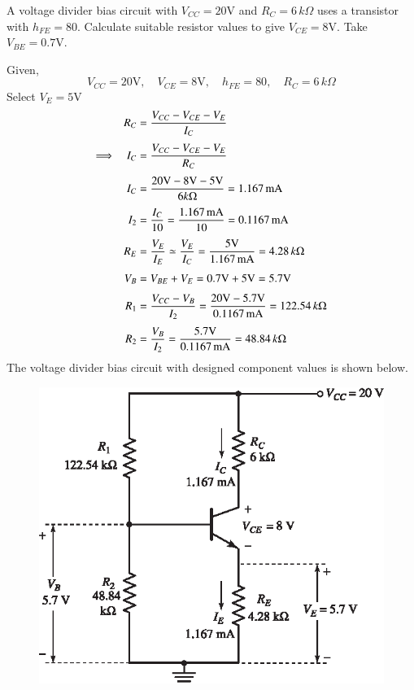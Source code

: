 \eject

\begin{example}\label{exam4.21}
A voltage divider bias circuit with $V_{CC}=20\text{V}$ and $R_{C}=6\,k\Omega$ uses a transistor with $h_{FE}=80$. Calculate suitable resistor values to give $V_{CE}=8\text{V}$. Take $V_{BE}=0.7\text{V}$.
\end{example}

\begin{solution}
Given,
$$
V_{CC}=20\text{V},\quad V_{CE}=8\text{V},\quad h_{FE}=80,\quad R_{C}=6\,k\Omega
$$
Select $V_{E}=5\text{V}$
\begin{align*}
R_{C} &= \frac{V_{CC}-V_{CE}-V_{E}}{I_{C}}\\[3pt]
\Longrightarrow\quad I_{C} &= \frac{V_{CC}-V_{CE}-V_{E}}{R_{C}}\\[3pt]
I_{C} &= \frac{20\text{V}-8\text{V}-5\text{V}}{6 k\Omega}=1.167\text{\,mA}\\[3pt]
I_{2} &=\frac{I_{C}}{10}=\frac{1.167\text{\,mA}}{10}=0.1167\text{\,mA}\\[3pt]
R_{E} &= \frac{V_{E}}{I_{E}}\simeq \frac{V_{E}}{I_{C}}=\frac{5\text{V}}{1.167\text{\,mA}}=4.28\,k\Omega\\[3pt]
V_{B} &= V_{BE}+V_{E}= 0.7\text{V}+5\text{V}= 5.7\text{V}\\[3pt]
R_{1} &= \frac{V_{CC}-V_{B}}{I_{2}}=\frac{20\text{V}-5.7\text{V}}{0.1167\text{\,mA}}=122.54\,k\Omega\\[3pt]
R_{2} &= \frac{V_{B}}{I_{2}}=\frac{5.7\text{V}}{0.1167\text{\,mA}}=48.84\,k\Omega
\end{align*}
The voltage divider bias circuit with designed component values is shown below.
\begin{figure}[H]
\centering
\includegraphics[scale=1.02]{chap3/S3-EE-03-IN032.eps}
\end{figure}
\vskip -1cm
\end{solution}

